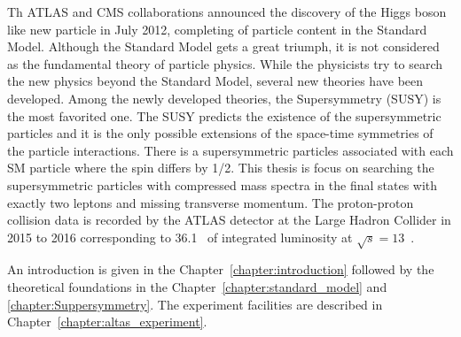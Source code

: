 Th ATLAS and CMS collaborations announced the discovery of the Higgs boson like new particle in July 2012, completing of particle content in the Standard Model.
Although the Standard Model gets a great triumph, it is not considered as the fundamental theory of particle physics.
While the physicists try to search the new physics beyond the Standard Model, several new theories have been developed.
Among the newly developed theories, the Supersymmetry (SUSY) is the most favorited one.
The SUSY predicts the existence of the supersymmetric particles and it is the only possible extensions of the space-time symmetries of the particle interactions.
There is a supersymmetric particles associated with each SM particle where the spin differs by 1/2.
This thesis is focus on searching the supersymmetric particles with compressed mass spectra in the final states with exactly two leptons and missing transverse momentum.
The proton-proton collision data is recorded by the ATLAS detector at the Large Hadron Collider in 2015 to 2016 corresponding to 36.1~{\ifb} of integrated luminosity at $\sqrt{s} = 13$~{\TeV}.

An introduction is given in the Chapter~\ref{chapter:introduction} followed by the theoretical foundations in the Chapter~\ref{chapter:standard_model} and \ref{chapter:Suppersymmetry}. The experiment facilities are described in Chapter~\ref{chapter:altas_experiment}.
